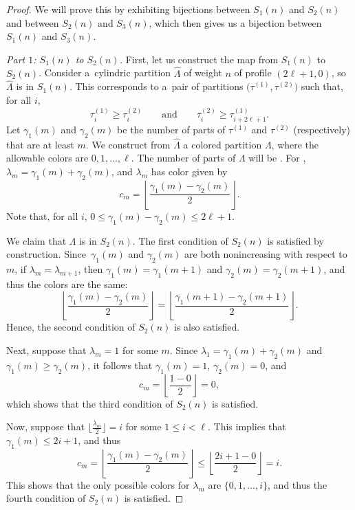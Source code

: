 \documentclass[pdftex]{sigma}
\numberwithin{equation}{section}
\theoremstyle{definition}
\newcommand{\LH}{{\widehat{\Lambda}}}
\begin{document}
\begin{proof}
We will prove this by exhibiting bijections between $S_1(n)$ and $S_2(n)$ and between $S_2(n)$ and $S_3(n)$, which then gives us a bijection between $S_1(n)$ and $S_3(n)$.

{\it Part $1$: $S_1(n)$ to $S_2(n)$.} First, let us construct the map from $S_1(n)$ to $S_2(n)$. Consider a~cylindric partition $\LH$ of weight $n$ of profile $(2\ell+1,0)$, so $\LH$ is in $S_1(n)$. This corresponds to a~pair of partitions $\bigl(\tau^{(1)},\tau^{(2)}\bigr)$ such that, for all $i$,
\begin{equation*}
\tau_i^{(1)} \ge \tau_i^{(2)} \qquad \text{and}\qquad \tau_i^{(2)} \ge \tau_{i+2\ell+1}^{(1)}.
\end{equation*}
Let $\gamma_1(m)$ and $\gamma_2(m)$ be the number of parts of $\tau^{(1)}$ and $\tau^{(2)}$ (respectively) that are at least $m$. We construct from $\LH$ a colored partition $\Lambda$, where the allowable colors are $0,1,\dots,\ell$. The number of parts of $\Lambda$ will be . For , $\lambda_m = \gamma_1(m)+\gamma_2(m)$, and $\lambda_m$ has color given by \[c_m=\left\lfloor\frac{\gamma_1(m)-\gamma_2(m)}2\right\rfloor.\] Note that, for all $i$, $0 \le \gamma_1(m)-\gamma_2(m) \le 2\ell+1$.

We claim that $\Lambda$ is in $S_2(n)$. The first condition of $S_2(n)$ is satisfied by construction. Since~$\gamma_1(m)$ and $\gamma_2(m)$ are both nonincreasing with respect to $m$, if $\lambda_{m}=\lambda_{m+1}$, then $\gamma_1(m)=\gamma_1(m+1)$ and $\gamma_2(m)=\gamma_2(m+1)$, and thus the colors are the same:{\samepage
\begin{equation*}
\left\lfloor\frac{\gamma_1(m)-\gamma_2(m)}2\right\rfloor=\left\lfloor\frac{\gamma_1(m+1)-\gamma_2(m+1)}2\right\rfloor.
\end{equation*}
Hence, the second condition of $S_2(n)$ is also satisfied.}

Next, suppose that $\lambda_m=1$ for some $m$. Since $\lambda_1= \gamma_1(m)+\gamma_2(m)$ and $\gamma_1(m)\ge \gamma_2(m)$, it follows that $\gamma_1(m)=1$, $\gamma_2(m)=0$, and
\[ c_m=\left\lfloor\frac{1-0}2\right\rfloor=0,\] which shows that the third condition of $S_2(n)$ is satisfied.

Now, suppose that $\bigl\lfloor\frac{\lambda_m}2\bigr\rfloor=i$ for some $1\le i <\ell$. This implies that $\gamma_1(m)\le 2i+1$, and thus \begin{equation*}
c_m=\left\lfloor\frac{\gamma_1(m)-\gamma_2(m)}2\right\rfloor\le\left\lfloor\frac{2i+1-0}2\right\rfloor=i.
\end{equation*}
This shows that the only possible colors for $\lambda_m$ are $\{0,1,\dots,i\}$, and thus the fourth condition of $S_2(n)$ is satisfied.


\end{proof}
\end{document}
